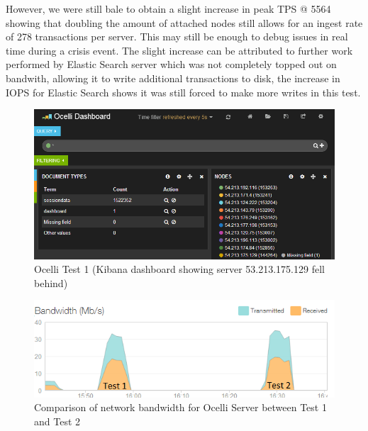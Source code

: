 \documentclass{llncs}
\begin{document}
However, we were still bale to obtain a slight increase in peak TPS @ 5564 showing that doubling the amount of attached nodes still allows for an ingest rate of 278 transactions per server. This may still be enough to debug issues in real time during a crisis event. The slight increase can be attributed to further work performed by Elastic Search server which was not completely topped out on bandwith, allowing it to write additional transactions to disk, the increase in IOPS for Elastic Search shows it was still forced to make more writes in this test.

\begin{figure}[h]
    \centering
    \includegraphics[scale=0.7]{app7}
    \caption{Ocelli Test 1 (Kibana dashboard showing server 53.213.175.129 fell behind)}
    \label{fig:ocelli_dm}
\end{figure}

\begin{figure}[h]
    \centering
    \includegraphics[scale=0.7]{app8}
    \caption{Comparison of network bandwidth for Ocelli Server between Test 1 and Test 2}
    \label{fig:ocelli_dm}
\end{figure}
\end{document}
